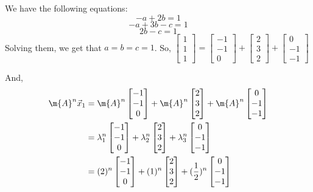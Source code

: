 \begin{enumerate}[label=(\alph*)]
{    We have the following equations:
    $$-a + 2b = 1$$
    $$-a + 3b - c = 1$$
    $$2b - c = 1$$
    Solving them, we get that $a = b = c = 1$. So, $\begin{bmatrix}1 \\ 1 \\ 1\end{bmatrix} = \begin{bmatrix}-1 \\ -1 \\ 0\end{bmatrix} + \begin{bmatrix}2 \\ 3 \\ 2\end{bmatrix} + \begin{bmatrix}0 \\ -1 \\ -1\end{bmatrix}$ 
    
    And, 
    \begin{align*}
    \m{A}^n\vec{x}_1 &= \m{A}^n \begin{bmatrix}-1 \\ -1 \\ 0\end{bmatrix} + \m{A}^n \begin{bmatrix}2 \\ 3 \\ 2\end{bmatrix} + \m{A}^n \begin{bmatrix}0 \\ -1 \\ -1\end{bmatrix} \\
    &= \lambda_1^n \begin{bmatrix}-1 \\ -1 \\ 0\end{bmatrix} + \lambda_2^n \begin{bmatrix}2 \\ 3 \\ 2\end{bmatrix} + \lambda_3^n \begin{bmatrix}0 \\ -1 \\ -1\end{bmatrix} \\
    &= (2)^n \begin{bmatrix}-1 \\ -1 \\ 0\end{bmatrix} + (1)^n \begin{bmatrix}2 \\ 3 \\ 2\end{bmatrix} + (\frac{1}{2})^n \begin{bmatrix}0 \\ -1 \\ -1\end{bmatrix} \\
    \end{align*}
    
}
\end{enumerate}
